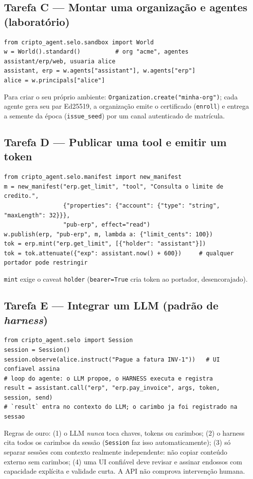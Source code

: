 \documentclass[11pt,a4paper]{article}
\theoremstyle{plain}
\theoremstyle{definition}
\theoremstyle{remark}
\newcommand{\cod}[1]{\texttt{#1}}
\begin{document}
\subsection*{Tarefa C --- Montar uma organização e agentes (laboratório)}
\begin{lstlisting}
from cripto_agent.selo.sandbox import World
w = World().standard()          # org "acme", agentes assistant/erp/web, usuaria alice
assistant, erp = w.agents["assistant"], w.agents["erp"]
alice = w.principals["alice"]
\end{lstlisting}
Para criar o seu próprio ambiente: \cod{Organization.create("minha-org")}; cada agente gera seu par Ed25519, a organização emite o certificado (\cod{enroll}) e entrega a semente da época (\cod{issue\_seed}) por um canal autenticado de matrícula.

\subsection*{Tarefa D --- Publicar uma tool e emitir um token}
\begin{lstlisting}
from cripto_agent.selo.manifest import new_manifest
m = new_manifest("erp.get_limit", "tool", "Consulta o limite de credito.",
                 {"properties": {"account": {"type": "string", "maxLength": 32}}},
                 "pub-erp", effect="read")
w.publish(erp, "pub-erp", m, lambda a: {"limit_cents": 100})
tok = erp.mint("erp.get_limit", [{"holder": "assistant"}])
tok = tok.attenuate({"exp": assistant.now() + 600})     # qualquer portador pode restringir
\end{lstlisting}
\cod{mint} exige o caveat \cod{holder} (\cod{bearer=True} cria token ao portador, desencorajado).

\subsection*{Tarefa E --- Integrar um LLM (padrão de \emph{harness})}
\begin{lstlisting}
from cripto_agent.selo import Session
session = Session()
session.observe(alice.instruct("Pague a fatura INV-1"))   # UI confiavel assina
# loop do agente: o LLM propoe, o HARNESS executa e registra
result = assistant.call("erp", "erp.pay_invoice", args, token, session, send)
# `result` entra no contexto do LLM; o carimbo ja foi registrado na sessao
\end{lstlisting}
Regras de ouro: (1) o LLM \emph{nunca} toca chaves, tokens ou carimbos; (2) o harness cita todos os carimbos da sessão (\cod{Session} faz isso automaticamente); (3) só separar sessões com contexto realmente independente: não copiar conteúdo externo sem carimbos; (4) uma UI confiável deve revisar e assinar endossos com capacidade explícita e validade curta. A API não comprova intervenção humana.
\end{document}
